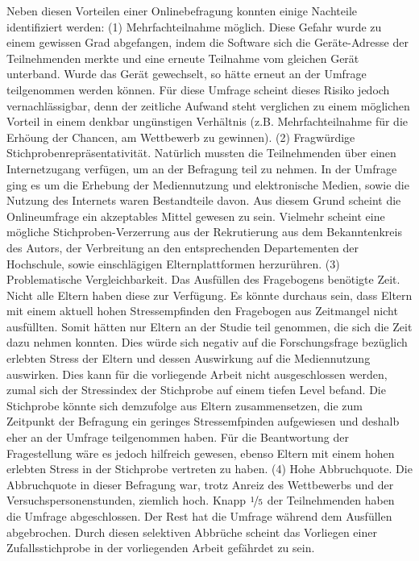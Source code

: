 Neben diesen Vorteilen einer Onlinebefragung konnten einige Nachteile identifiziert werden\cite{Rey2009}: (1) Mehrfachteilnahme möglich. Diese Gefahr wurde zu einem gewissen Grad abgefangen, indem die Software sich die Geräte-Adresse der Teilnehmenden merkte und eine erneute Teilnahme vom gleichen Gerät unterband. Wurde das Gerät gewechselt, so hätte erneut an der Umfrage teilgenommen werden können. Für diese Umfrage scheint dieses Risiko jedoch vernachlässigbar, denn der zeitliche Aufwand steht verglichen zu einem möglichen Vorteil in einem denkbar ungünstigen Verhältnis (z.B. Mehrfachteilnahme für die Erhöung der Chancen, am Wettbewerb zu gewinnen). (2) Fragwürdige Stichprobenrepräsentativität. Natürlich mussten die Teilnehmenden über einen Internetzugang verfügen, um an der Befragung teil zu nehmen. In der Umfrage ging es um die Erhebung der Mediennutzung und elektronische Medien, sowie die Nutzung des Internets waren Bestandteile davon. Aus diesem Grund scheint die Onlineumfrage ein akzeptables Mittel gewesen zu sein. Vielmehr scheint eine mögliche Stichproben-Verzerrung aus der Rekrutierung aus dem Bekanntenkreis des Autors, der Verbreitung an den entsprechenden Departementen der Hochschule, sowie einschlägigen Elternplattformen herzurühren. (3) Problematische Vergleichbarkeit. Das Ausfüllen des Fragebogens benötigte Zeit. Nicht alle Eltern haben diese zur Verfügung. Es könnte durchaus sein, dass Eltern mit einem aktuell hohen Stressempfinden den Fragebogen aus Zeitmangel nicht ausfüllten. Somit hätten nur Eltern an der Studie teil genommen, die sich die Zeit dazu nehmen konnten. Dies würde sich negativ auf die Forschungsfrage bezüglich erlebten Stress der Eltern und dessen Auswirkung auf die Mediennutzung auswirken. Dies kann für die vorliegende Arbeit nicht ausgeschlossen werden, zumal sich der Stressindex der Stichprobe auf einem tiefen Level befand. Die Stichprobe könnte sich demzufolge aus Eltern zusammensetzen, die zum Zeitpunkt der Befragung ein geringes Stressemfpinden aufgewiesen und deshalb eher an der Umfrage teilgenommen haben. Für die Beantwortung der Fragestellung wäre es jedoch hilfreich gewesen, ebenso Eltern mit einem hohen erlebten Stress in der Stichprobe vertreten zu haben. (4) Hohe Abbruchquote. Die Abbruchquote in dieser Befragung war, trotz Anreiz des Wettbewerbs und der Versuchspersonenstunden, ziemlich hoch. Knapp $\nicefrac{1}{5}$ der Teilnehmenden haben die Umfrage abgeschlossen. Der Rest hat die Umfrage während dem Ausfüllen abgebrochen. Durch diesen selektiven Abbrüche scheint das Vorliegen einer Zufallsstichprobe in der vorliegenden Arbeit gefährdet zu sein. 

